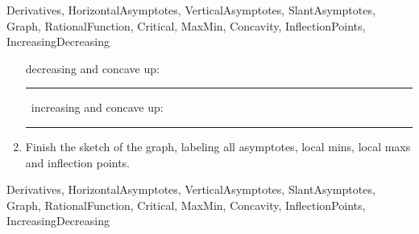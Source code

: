 \begin{tagblock}{Derivatives, HorizontalAsymptotes, VerticalAsymptotes, SlantAsymptotes, Graph, RationalFunction, Critical, MaxMin, Concavity, InflectionPoints, IncreasingDecreasing  }
\begin{question}
\begin{enumerate}
decreasing and concave up:   \rule{2cm}{0.1mm} \,   increasing and concave up:   \rule{2cm}{0.1mm}

\item Finish the sketch of the graph, labeling all asymptotes, local mins, local maxs and inflection points.  
\end{enumerate}


	
\begin{tags}
	   Derivatives, HorizontalAsymptotes, VerticalAsymptotes, SlantAsymptotes, Graph, RationalFunction, Critical, MaxMin, Concavity, InflectionPoints, IncreasingDecreasing
\end{tags}
	
\begin{diary}
\end{diary}
	
\begin{solution}
	   
\end{solution}
	
\end{question}

\end{tagblock}


